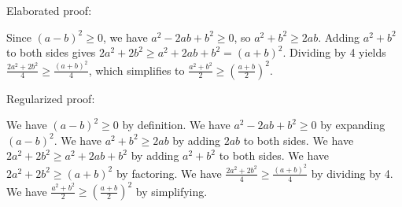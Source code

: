 \documentclass{article}
\begin{document}
Elaborated proof:
\begin{tcolorbox}[colback=green!10, width=\linewidth]
Since $(a-b)^2 \ge 0$, we have $a^2 - 2ab + b^2 \ge 0$, so $a^2 + b^2 \ge 2ab$.  Adding $a^2 + b^2$ to both sides gives $2a^2 + 2b^2 \ge a^2 + 2ab + b^2 = (a+b)^2$. Dividing by 4 yields $\frac{2a^2 + 2b^2}{4} \ge \frac{(a+b)^2}{4}$, which simplifies to $\frac{a^2+b^2}{2} \ge \left(\frac{a+b}{2}\right)^2$.
\end{tcolorbox}

Regularized proof:
\begin{tcolorbox}[colback=red!10, width=\linewidth]
We have $(a-b)^2 \ge 0$ by definition. We have $a^2 - 2ab + b^2 \ge 0$ by expanding $(a-b)^2$. We have $a^2 + b^2 \ge 2ab$ by adding $2ab$ to both sides. We have $2a^2 + 2b^2 \ge a^2 + 2ab + b^2$ by adding $a^2 + b^2$ to both sides. We have $2a^2 + 2b^2 \ge (a+b)^2$ by factoring. We have $\frac{2a^2 + 2b^2}{4} \ge \frac{(a+b)^2}{4}$ by dividing by 4. We have $\frac{a^2+b^2}{2} \ge \left(\frac{a+b}{2}\right)^2$ by simplifying.
\end{tcolorbox}
\end{document}
